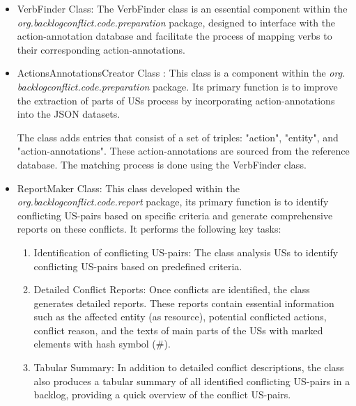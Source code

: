 \begin{itemize}
		
	
	\item VerbFinder Class: The VerbFinder class is an essential component within the \textit{org.backlogconflict.code.preparation} package, designed to interface with the action-annotation database and facilitate the process of mapping verbs to their corresponding action-annotations. 
	
	\item ActionsAnnotationsCreator Class : This class is a component within the \textit{org. backlogconflict.code.preparation} package. Its primary function is to improve the extraction of parts of USs process by incorporating action-annotations into the JSON datasets. 
	
	The class adds entries that consist of a set of triples: "action", "entity", and "action-annotations". These action-annotations are sourced from the reference database. The matching process is done using the VerbFinder class. 
	
	\item ReportMaker Class: This class developed within the \textit{org.backlogconflict.code.report} package, its primary function is to identify conflicting US-pairs based on specific criteria and generate comprehensive reports on these conflicts. It performs the following key tasks:%
	\begin{enumerate}
		\item Identification of conflicting US-pairs: The class analysis USs to identify conflicting US-pairs based on predefined criteria.
		
		\item Detailed Conflict Reports: Once conflicts are identified, the class generates detailed reports. These reports contain essential information such as the affected entity (as resource), potential conflicted actions, conflict reason, and the texts of main parts of the USs with marked elements with hash symbol (\#).
		
		\item Tabular Summary: In addition to detailed conflict descriptions, the class also produces a tabular summary of all identified conflicting US-pairs in a backlog, providing a quick overview of the conflict US-pairs.
	\end{enumerate}

	
\end{itemize}
